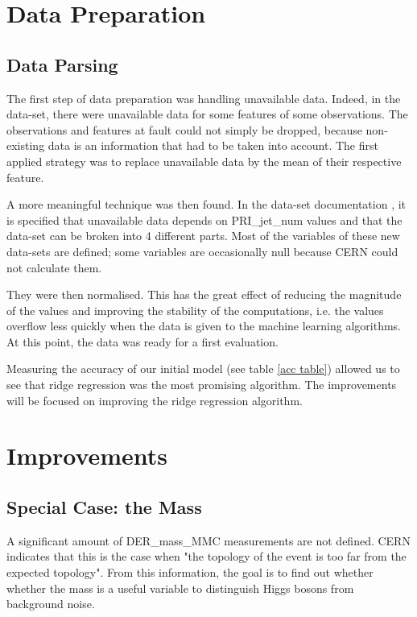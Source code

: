 \documentclass[10pt,conference,compsocconf]{IEEEtran}
\begin{document}
\section{Data Preparation}

\subsection{Data Parsing}

The first step of data preparation was handling unavailable data.
Indeed, in the data-set, there were unavailable data for some features of some observations.
The observations and features at fault could not simply be dropped, because non-existing data is an information that had to be taken into account.
The first applied strategy was to replace unavailable data by the mean of their respective feature.

A more meaningful technique was then found.
In the data-set documentation \cite{higscern}, it is specified that unavailable data depends on PRI\_jet\_num  values and that the data-set can be broken into 4 different parts.
Most of the variables of these new data-sets are defined; some variables are occasionally null because CERN could not calculate them.

They were then normalised.
This has the great effect of reducing the magnitude of the values and improving the stability of the computations, i.e. the values overflow less quickly when the data is given to the machine learning algorithms. At this point, the data was ready for a first evaluation.

Measuring the accuracy of our initial model (see table \ref{acc table}) allowed us to see that ridge regression was the most promising algorithm. The improvements will be focused on improving the ridge regression algorithm.


\section{Improvements}


\subsection{Special Case: the Mass} \label{mass}

A significant amount of DER\_mass\_MMC measurements are not defined.
CERN \cite{higscern} indicates that this is the case when "the topology of the event is too far from the expected topology".
From this information, the goal is to find out whether whether the mass is a useful variable to distinguish Higgs bosons from background noise.
\end{document}
